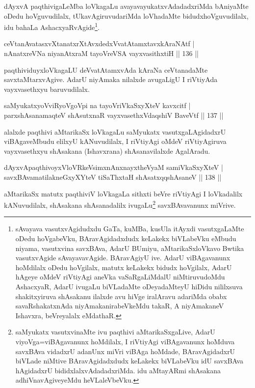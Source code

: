 \begin{artha}%
dAyxvA paqthivigaLeMba loVkagaLu avayavayukatxvAdadadxriMda bAniyaMte oDedu hoVguvudilalx, tUkavAgiruvudariMda loVhadaMte bidudxhoVguvudilalx, idu bahaLa AshacxyaRvAgide\footnote[1]{sAvayava vasutxvAgidudxdu GaTa, kuMBa, kusUla itAyxdi vasutxgaLaMte oDedu hoVgabeVku, BAravAgidadxdudx keLakekx biVLabeVku eMbudu niyama, vasutxvina savxBAva, AdarU BUmiyu, aMtarikaSxloVkavo Bwtika vasutxvAgide sAvayavavAgide. BAravAgiyU ive. AdarU viBAgavanunx hoMdilalx oDedu hoVgilalx, matutx keLakekx bidudx hoVgilalx, AdarU hAgeye oMdeV riVtiyAgi aneVka vaSaRgaLiMdalU niMtiruvudoMdu AshacxyaR, AdarU ivugaLu biVLadaMte oDeyadaMteyU hiDidu nililxsuva shakitxyiruva shAsakanu ilalxde avu hiVge iralAravu adariMda obabx savaRshakatxnAda niyAmakanirabeVkeMdu takaR, A niyAmakaneV Ishavxra, beVreyalalx eMdathaR.}.
\end{artha}

\begin{shl}
ceVtanAvatasxvXtanatxrXtAvxdedxVvatAtamxtavxkAraNAtf |\\
nAnatxreVNa niyanAtxraM tayoVreVSA vayxvasithxtiH \hfill || 136 ||
\end{shl}

\begin{artha}
paqthividuyxloVkagaLU deVvatAtamxvAda kAraNa ceVtanadaMte savxtaMtarxvAgive. AdarU niyAmaka nilalxde avugaLigU I riVtiyAda vayxvasethxyu baruvudilalx.
\end{artha}

\begin{shl}
saMyukatxyoVviRyoVgoV\s pi na tayoVriVkaSxyXteV kavxcitf |\\
parxshAsanamaqteV shAsutxnaR vayxvasethxVdaqshiV BaveVtf \hfill || 137 ||
\end{shl}

\begin{artha}
alalxde paqthivi aMtarikaSx loVkagaLu saMyukatx vasutxgaLAgidadxrU viBAga\-veMbudu elilxyU kANuvudilalx, I riVtiyAgi oMdeV riVtiyAgiruva vayxvasethxyu shAsakana (Ishavxrana) shAsanavilalxde AgalAradu.
\end{artha}

\begin{shl}
dAyxvApaqthivoyxVloVRkeV\s simxnAnxnayxtheVyaM samiVkaSxyXteV |\\
savxBAvamatilakneGxyXYteV tiSaThxtaH shAsatxqqshAsaneV \hfill || 138 ||
\end{shl}

\begin{artha}
aMtarikaSx matutx paqthiviV loVkagaLa sithxti beVre riVtiyAgi I loVkadalilx kANuvudilalx, shAsakana shAsanadalilx ivugaLu\footnote[2]{saMyukatx vasutxvinaMte ivu paqthivi aMtarikaSxgaLive, AdarU viyoVga=viBAgavanunx hoMdilalx, I riVtiyAgi viBAgavanunx hoMduva savxBAva vidadxrU adanUnx miVri viBAga hoMdade, BAravAgidadxrU biVLade niMtive BAravAgidadxdudx keLakekx biVLabeVku idU savxBAva hAgidadxrU bididxlalxvAdadadxriMda. idu aMtayARmi shAsakana adhiVnavAgiveyeMdu heVLaleVbeVku.} savxBAvavanunx miVrive.
\end{artha}

